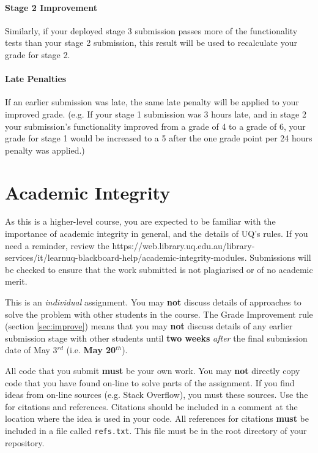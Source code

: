 \documentclass{csse4400}
\begin{document}
\paragraph{Stage 2 Improvement}
Similarly, if your deployed stage 3 submission passes more of the functionality tests than your stage 2 submission, this result will be used to recalculate your grade for stage 2.

\paragraph{Late Penalties}
If an earlier submission was late, the same late penalty will be applied to your improved grade.
(e.g. If your stage 1 submission was 3 hours late,
and in stage 2 your submission's functionality improved from a grade of 4 to a grade of 6,
your grade for stage 1 would be increased to a 5 after the one grade point per 24 hours penalty was applied.)


\section{Academic Integrity}
As this is a higher-level course, you are expected to be familiar with the importance of academic integrity in general,
and the details of UQ's rules.
If you need a reminder, review the 
{https://web.library.uq.edu.au/library-services/it/learnuq-blackboard-help/academic-integrity-modules}.
Submissions will be checked to ensure that the work submitted is not plagiarised or of no academic merit.

This is an \textit{individual} assignment.
You may \textbf{not} discuss details of approaches to solve the problem with other students in the course.
The Grade Improvement rule (section \ref{sec:improve}) means that
you may \textbf{not} discuss details of any earlier submission stage with other students
until \textbf{two weeks} \textit{after} the final submission date of May 3$^{rd}$ (i.e. \textbf{May 20$^{th}$}).

All code that you submit \textbf{must} be your own work.
You may \textbf{not} directly copy code that you have found on-line to solve parts of the assignment.
If you find ideas from on-line sources (e.g. Stack Overflow),
you must  these sources.
Use the 
for citations and references.
Citations should be included in a comment at the location where the idea is used in your code.
All references for citations \textbf{must} be included in a file called \texttt{refs.txt}.
This file must be in the root directory of your repository.
\end{document}
